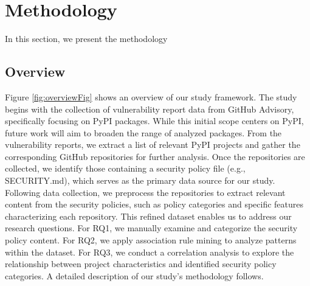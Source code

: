 \section{Methodology}
\label{3_methodology}
\usetikzlibrary{shapes, arrows.meta, positioning}
In this section, we present the methodology



\subsection{Overview} 
Figure \ref{fig:overviewFig} shows an overview of our study framework. The study begins with the collection of vulnerability report data from GitHub Advisory, specifically focusing on PyPI packages. While this initial scope centers on PyPI, future work will aim to broaden the range of analyzed packages. From the vulnerability reports, we extract a list of relevant PyPI projects and gather the corresponding GitHub repositories for further analysis. Once the repositories are collected, we identify those containing a security policy file (e.g., SECURITY.md), which serves as the primary data source for our study. Following data collection, we preprocess the repositories to extract relevant content from the security policies, such as policy categories and specific features characterizing each repository. This refined dataset enables us to address our research questions. For RQ1, we manually examine and categorize the security policy content. For RQ2, we apply association rule mining\cite{ReadME}
to analyze patterns within the dataset. For RQ3, we conduct a correlation analysis to explore the relationship between project characteristics and identified security policy categories. A detailed description of our study’s methodology follows.





